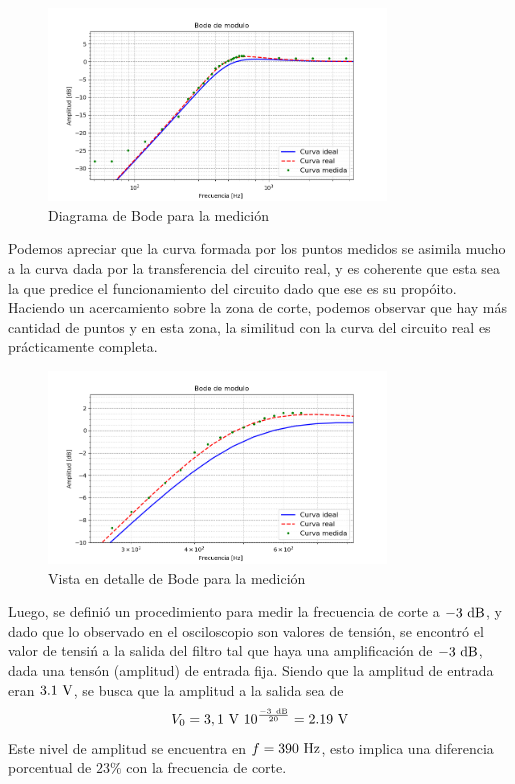 \begin{centering}
	\begin{figure}[h]
		\centering
		\includegraphics[width=0.8\textwidth]{imagenes/bodeMedicion}
		\caption{Diagrama de Bode para la medici\'on}
	\end{figure}
\end{centering}

Podemos apreciar que la curva formada por los puntos medidos se asimila mucho a la curva dada por la transferencia del circuito real, y es coherente que esta sea la que predice el funcionamiento del circuito dado que ese es su prop\'oito.\\
Haciendo un acercamiento sobre la zona de corte, podemos observar que hay m\'as cantidad de puntos y en esta zona, la similitud con la curva del circuito real es pr\'acticamente completa.

\begin{centering}
	\begin{figure}[h]
		\centering
		\includegraphics[width=0.8\textwidth]{imagenes/bodeMedicionDetalle.png}
		\caption{Vista en detalle de Bode para la medici\'on}
	\end{figure}
\end{centering}

\pagebreak

Luego, se defini\'o un procedimiento para medir la frecuencia de corte a $-3\dB$, y dado que lo observado en el osciloscopio son valores de tensi\'on, se encontr\'o el valor de tensi\'n a la salida del filtro tal que haya una amplificaci\'on de $-3\dB$, dada una tens\'on (amplitud) de entrada fija.
Siendo que la amplitud de entrada eran $3.1\ \si{\volt}$, se busca que la amplitud a la salida sea de 
\begin{equation}
	V_0= 3,1 \V \ 10^{\frac{-3 \dB}{20}}	= 2.19\V
\end{equation}
Este nivel  de amplitud se encuentra en $f=390\ \si{\hertz}$, esto implica  una diferencia porcentual de $23\%$ con la frecuencia de corte.

